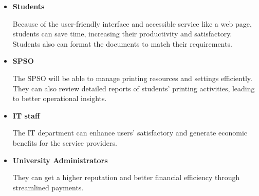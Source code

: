 \documentclass[a4paper]{report}
\begin{document}
\begin{itemize}
    \item \textbf{Students}
    
    Because of the user-friendly interface and accessible service like a web page, students can save time, increasing their productivity and satisfactory. Students also can format the documents to match their requirements. 
    \item \textbf{SPSO}
    
    The SPSO will be able to manage printing resources and settings efficiently. They can also review detailed reports of students’ printing activities, leading to better operational insights.
    \item \textbf{IT staff}
    
    The IT department can enhance users’ satisfactory and generate economic benefits for the service providers.
    \item \textbf{University Administrators}
    
    They can get a higher reputation and better financial efficiency through streamlined payments. 
\end{itemize}
\end{document}
